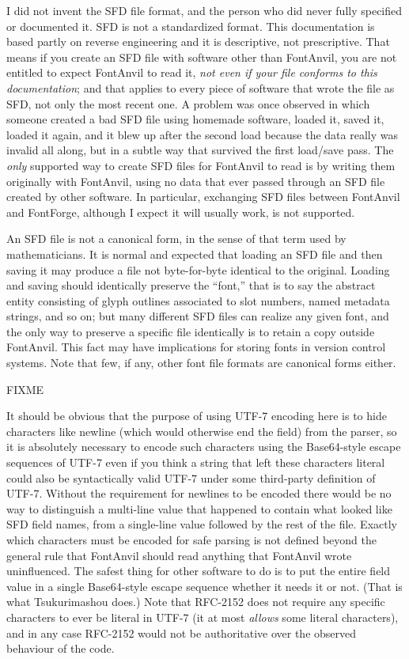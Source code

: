 \documentclass[11pt]{report}
\begin{document}
\begin{framed}
I did not invent the SFD file format, and the person who did never fully
specified or documented it.  SFD is not a standardized format.  This
documentation is based partly on reverse engineering and it is descriptive,
not prescriptive.  That means if you create an SFD file with software other
than FontAnvil, you are not entitled to expect FontAnvil to read it,
\emph{not even if your file conforms to this documentation}; and that
applies to every piece of software that wrote the file as SFD,
not only the most recent one.  A problem was once observed in which
someone created a bad SFD file using homemade software, loaded it, saved
it, loaded it again, and it blew up after the second load because the data
really was invalid all along, but in a subtle way that survived
the first load/save pass.  The \emph{only}
supported way to create SFD files for FontAnvil to read is by writing them
originally with FontAnvil, using no data that ever passed through an SFD
file created by other software.  In particular, exchanging SFD files
between FontAnvil and FontForge, although I expect it will usually work,
is not supported.
\end{framed}

An SFD file is not a canonical form, in the sense of that term used by
mathematicians.  It is normal and expected that loading an SFD file and then
saving it may produce a file not byte-for-byte identical to the original. 
Loading and saving should identically preserve the  ``font,'' that is to
say the abstract entity consisting of glyph outlines associated to slot
numbers, named metadata strings, and so on; but many different SFD files can
realize any given font, and the only way to preserve a specific file
identically is to retain a copy outside FontAnvil.  This fact may have
implications for storing fonts in version control systems.  Note that few,
if any, other font file formats are canonical forms either.

FIXME

It should be obvious that the purpose of using UTF-7 encoding here is to
hide characters like newline (which would otherwise end the field) from the
parser, so it is absolutely necessary to encode such characters using the
Base64-style escape sequences of UTF-7 even if you think a string that left
these characters literal could also be syntactically valid UTF-7 under some
third-party definition of UTF-7.  Without the requirement for newlines to be
encoded there would be no way to distinguish a multi-line value that
happened to contain what looked like SFD field names, from a single-line
value followed by the rest of the file.  Exactly which characters must be
encoded for safe parsing is not defined beyond the general rule that
FontAnvil should read anything that FontAnvil wrote uninfluenced.  The
safest thing for other software to do is to put the entire field value in a
single Base64-style escape sequence whether it needs it or not.  (That is
what Tsukurimashou does.) Note that RFC-2152 does not require any specific
characters to ever be literal in UTF-7 (it at most \emph{allows} some
literal characters), and in any case RFC-2152 would not be authoritative
over the observed behaviour of the code.
\end{document}
